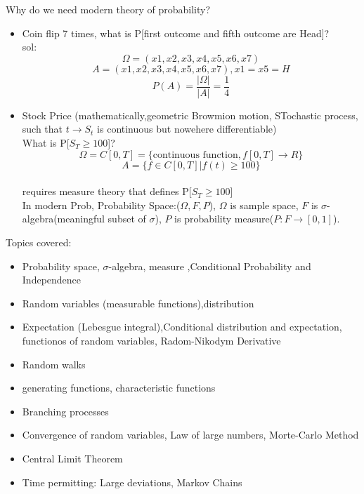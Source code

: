 Why do we need modern theory of probability?
\begin{example}[]{}
    \begin{itemize}
        \item Coin flip 7 times, what is P[first outcome and fifth outcome are Head]?
    \\sol: \[\Omega=(x1,x2,x3,x4,x5,x6,x7)\]\[ A=(x1,x2,x3,x4,x5,x6,x7),x1=x5=H\]\[P(A)=\frac{|\Omega|}{|A|}=\frac{1}{4} \] 
        \item Stock Price (mathematically,geometric Browmion motion, STochastic process, such that $t \rightarrow S_t$ is continuous but nowehere differentiable)
     \\What is P[$S_T \geq 100$]? 
     \[\Omega= C[0,T]=\{\text{continuous function}, f[0,T] \rightarrow R\}\]
     \[A=\{f \in C[0,T] | f(t) \geq 100\}\]
     \\requires measure theory that defines P[$S_T \geq 100$]
     \\In modern Prob, Probability Space:($\Omega,F,P$), $\Omega$ is sample space, $F$ is $\sigma$-algebra(meaningful subset of $\sigma$), $P$ is probability measure($P:F\rightarrow[0,1]$).
    \end{itemize}
    \end{example}
Topics covered:
\begin{itemize}
    \item Probability space, $\sigma$-algebra, measure ,Conditional Probability and Independence
    \item Random variables (measurable functions),distribution
    \item Expectation (Lebesgue integral),Conditional distribution and expectation, functionos of random variables, Radom-Nikodym Derivative
    \item Random walks
    \item generating functions, characteristic functions
    \item Branching processes
    \item Convergence of random variables, Law of large numbers, Morte-Carlo Method
    \item Central Limit Theorem
    \item Time permitting: Large deviations, Markov Chains
\end{itemize}



